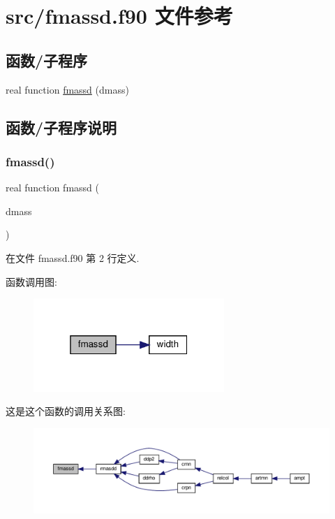 \hypertarget{fmassd_8f90}{}\section{src/fmassd.f90 文件参考}
\label{fmassd_8f90}
\subsection*{函数/子程序}
\begin{DoxyCompactItemize}
\item 
real function \mbox{\hyperlink{fmassd_8f90_a0578044daab10f7da87fe8443bbb1e7e}{fmassd}} (dmass)
\end{DoxyCompactItemize}


\subsection{函数/子程序说明}
\mbox{\label{fmassd_8f90_a0578044daab10f7da87fe8443bbb1e7e}} 
\subsubsection{\texorpdfstring{fmassd()}{fmassd()}}
{\footnotesize\ttfamily real function fmassd (\begin{DoxyParamCaption}\item[{}]{dmass }\end{DoxyParamCaption})}



在文件 fmassd.\+f90 第 2 行定义.

函数调用图\+:
\nopagebreak
\begin{figure}[H]
\begin{center}
\leavevmode
\includegraphics[width=205pt]{fmassd_8f90_a0578044daab10f7da87fe8443bbb1e7e_cgraph}
\end{center}
\end{figure}
这是这个函数的调用关系图\+:
\nopagebreak
\begin{figure}[H]
\begin{center}
\leavevmode
\includegraphics[width=350pt]{fmassd_8f90_a0578044daab10f7da87fe8443bbb1e7e_icgraph}
\end{center}
\end{figure}
